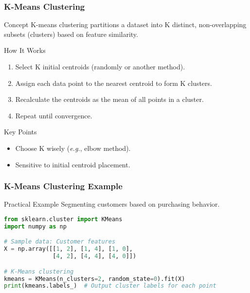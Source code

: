 \documentclass[aspectratio=169]{beamer}
\begin{document}
\begin{frame}
    \frametitle{K-Means Clustering}
    \begin{block}{Concept}
        K-means clustering partitions a dataset into K distinct, non-overlapping subsets (clusters) based on feature similarity.
    \end{block}
    
    \begin{block}{How It Works}
        \begin{enumerate}
            \item Select K initial centroids (randomly or another method).
            \item Assign each data point to the nearest centroid to form K clusters.
            \item Recalculate the centroids as the mean of all points in a cluster.
            \item Repeat until convergence.
        \end{enumerate}
    \end{block}
    
    \begin{block}{Key Points}
        \begin{itemize}
            \item Choose K wisely (\textit{e.g.}, elbow method).
            \item Sensitive to initial centroid placement.
        \end{itemize}
    \end{block}
\end{frame}

\begin{frame}[fragile]
    \frametitle{K-Means Clustering Example}
    \begin{block}{Practical Example}
        Segmenting customers based on purchasing behavior.
    \end{block}
    
    \begin{lstlisting}[language=Python]
from sklearn.cluster import KMeans
import numpy as np

# Sample data: Customer features
X = np.array([[1, 2], [1, 4], [1, 0],
              [4, 2], [4, 4], [4, 0]])

# K-Means clustering
kmeans = KMeans(n_clusters=2, random_state=0).fit(X)
print(kmeans.labels_)  # Output cluster labels for each point
    \end{lstlisting}
\end{frame}
\end{document}
